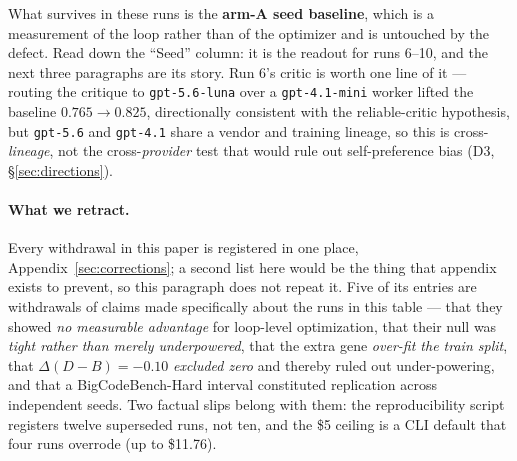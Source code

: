 \documentclass[11pt]{article}
\newcommand{\dd}{\ensuremath{\Delta}}
\begin{document}
What survives in these runs is the \textbf{arm-A seed baseline}, which is a measurement of
the loop rather than of the optimizer and is untouched by the defect. Read down the ``Seed''
column: it is the readout for runs 6--10, and the next three paragraphs are its story. Run
6's critic is worth one line of it --- routing the critique to \texttt{gpt-5.6-luna} over a
\texttt{gpt-4.1-mini} worker lifted the baseline $0.765 \to 0.825$, directionally consistent
with the reliable-critic hypothesis, but \texttt{gpt-5.6} and \texttt{gpt-4.1} share a vendor
and training lineage, so this is cross-\emph{lineage}, not the cross-\emph{provider} test
that would rule out self-preference bias (D3, \S\ref{sec:directions}).

\paragraph{What we retract.}
Every withdrawal in this paper is registered in one place,
Appendix~\ref{sec:corrections}; a second list here would be the thing that appendix exists to
prevent, so this paragraph does not repeat it. Five of its entries are withdrawals of claims
made specifically about the runs in this table --- that they showed \emph{no measurable
advantage} for loop-level optimization, that their null was \emph{tight rather than merely
underpowered}, that the extra gene \emph{over-fit the train split}, that
$\dd(D-B) = -0.10$ \emph{excluded zero} and thereby ruled out under-powering, and that a
BigCodeBench-Hard interval constituted replication across independent seeds. Two factual slips
belong with them: the reproducibility script registers twelve superseded runs, not ten, and the
\$5 ceiling is a CLI default that four runs overrode (up to \$11.76).
\end{document}

